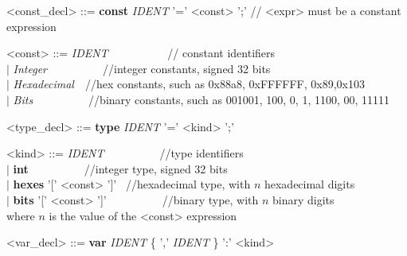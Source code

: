 \documentclass{article}
\begin{document}
\begin{grammar} \small

{\renewcommand\baselinestretch{0}\selectfont
<const\_decl>     ::=   \textbf{const}  \emph{IDENT} '=' <const> ';'    // <expr> must be a constant expression

<const>     ::=   \emph{IDENT} ~~~~~~~~~~// constant identifiers  \\
     \hspace*{0.65cm} $\mid$  \emph{Integer}~~~~~~~~~~//integer constants, signed 32 bits \\
     \hspace*{0.65cm} $\mid$  \emph{Hexadecimal}~~//hex constants, such as 0x88a8, 0xFFFFFF, 0x89,0x103 \\
     \hspace*{0.65cm} $\mid$  \emph{Bits}~~~~~~~~~~//binary constants, such as 001001, 100, 0, 1, 1100, 00, 11111
\par}

\end{grammar}

\begin{grammar} \small

{\renewcommand\baselinestretch{0}\selectfont

<type\_decl>     ::=   \textbf{type}  \emph{IDENT} '=' <kind> ';'

<kind>     ::=   \emph{IDENT}~~~~~~~~~~//type identifiers  \\
     \hspace*{0.56cm} $\mid$  \textbf{int}~~~~~~~~~~//integer type, signed 32 bits \\
     \hspace*{0.56cm} $\mid$  \textbf{hexes} '[' <const> ']'~ //hexadecimal type, with $n$ hexadecimal digits\\
     \hspace*{0.56cm} $\mid$  \textbf{bits} '[' <const> ']'~~~~~~~~~~//binary type, with $n$  binary digits \\
     \hspace*{0.5cm}where $n$ is the value of the <const> expression

\par}

\end{grammar}

\begin{grammar} \small

{\renewcommand\baselinestretch{0}\selectfont

<var\_decl>     ::=  \textbf{var} \emph{IDENT} \{ ',' \emph{IDENT} \} ':' <kind>

\par}

\end{grammar}
\end{document}
